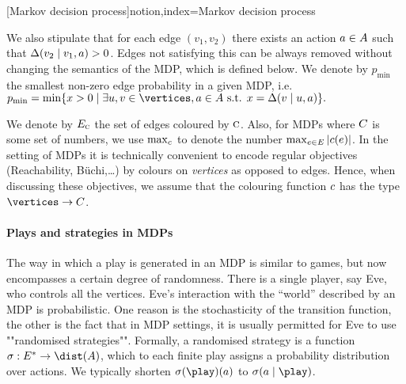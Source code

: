 [Markov decision process]{notion,index={Markov decision process}}

We also stipulate that for each edge $(v_1,v_2)$ there exists an action $a\in A$ such that $\Delta(v_2\mid v_1,a)>0$. Edges not satisfying this can be always removed without changing the semantics of the MDP, which is defined below. We denote by $ p_{\min} $ the smallest non-zero edge probability in a given MDP, i.e. $ p_{\min} = \min\{x>0 \mid \exists u,v \in \vertices, a \in \actions \text{ s.t. } x = \probTranFunc(v\mid u,a)\}. $

We denote by $E_{\textsc{c}}$ the set of edges coloured by $\textsc{c}$. Also, for MDPs where $C$ is some set of numbers, we use $\max_{c}$ to denote the number $\max_{e\in 
	E}|c(e)|$.
In the setting of MDPs it is technically convenient to encode regular objectives (Reachability, B\"uchi,\dots) by colours on \emph{vertices} as opposed to edges. Hence, when discussing these objectives, we assume that the colouring function $c$ has the type $\vertices \rightarrow \colours$.



\paragraph{Plays and strategies in MDPs}


 The way in which a play is generated in an MDP is similar to games, but now encompasses a certain degree of randomness. There is a single player, say Eve, who controls all the vertices. Eve's interaction with the ``world'' described by an MDP is probabilistic. One reason is the stochasticity of the transition function, the other is the fact that in MDP settings, it is usually permitted for Eve to use ""randomised strategies"". Formally, a randomised strategy is a function $\sigma : E^* \to \dist(A)$, which to each finite play assigns a probability distribution over actions. 
 We typically shorten $\sigma(\play)(a)$ to $\sigma(a\mid \play)$.
 
